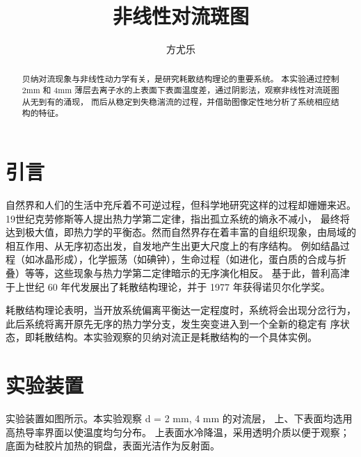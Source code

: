 \documentclass[revtex4-2]{mpltx}
\begin{document}
\title{非线性对流斑图}
\author{方尤乐}

\begin{abstract}
    贝纳对流现象与非线性动力学有关，是研究耗散结构理论的重要系统。
    本实验通过控制 2mm 和 4mm 薄层去离子水的上表面下表面温度差，通过阴影法，观察非线性对流斑图从无到有的涌现，
    而后从稳定到失稳湍流的过程，并借助图像定性地分析了系统相应结构的特征。
\end{abstract}
\maketitle
\section{引言}
自然界和人们的生活中充斥着不可逆过程，但科学地研究这样的过程却姗姗来迟。19世纪克劳修斯等人提出热力学第二定律，指出孤立系统的熵永不减小，
最终将达到极大值，即热力学的平衡态。然而自然界存在着丰富的自组织现象，由局域的相互作用、从无序初态出发，自发地产生出更大尺度上的有序结构。
例如结晶过程（如冰晶形成），化学振荡（如碘钟），生命过程（如进化，蛋白质的合成与折叠）等等，这些现象与热力学第二定律暗示的无序演化相反。
基于此，普利高津于上世纪 60 年代发展出了耗散结构理论，并于 1977 年获得诺贝尔化学奖。\cite{jindaishiyan}

耗散结构理论表明，当开放系统偏离平衡达一定程度时，系统将会出现分岔行为，此后系统将离开原先无序的热力学分支，发生突变进入到一个全新的稳定有
序状态，即耗散结构。本实验观察的贝纳对流正是耗散结构的一个具体实例。

\section{实验装置}
实验装置如图所示。本实验观察 d = 2 mm, 4 mm 的对流层，
上、下表面均选用高热导率界面以使温度均匀分布。
上表面水冷降温，采用透明介质以便于观察；
底面为硅胶片加热的铜盘，表面光洁作为反射面。
\end{document}
